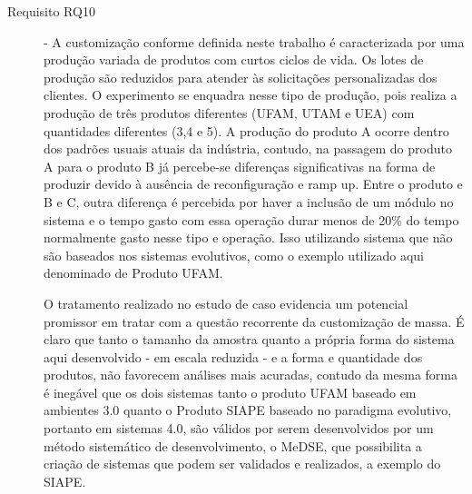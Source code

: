 \documentclass[10pt,letterpaper,twocolumn]{IEEEtran}
\begin{document}
\begin{description}
	\item[Requisito RQ10] - A customização conforme definida neste trabalho é caracterizada por uma produção variada de produtos com curtos  ciclos de vida. Os lotes de produção são reduzidos para atender às solicitações personalizadas dos clientes. O experimento se enquadra nesse tipo de produção, pois realiza a produção de três produtos diferentes (UFAM, UTAM e UEA) com quantidades diferentes (3,4 e 5). A produção do produto A ocorre dentro dos padrões usuais atuais da indústria, contudo, na passagem do produto A para o produto B já percebe-se diferenças significativas na forma de produzir devido à ausência de reconfiguração e ramp up. Entre o produto e B e C, outra diferença é percebida por haver a inclusão de um módulo no sistema e o tempo gasto com essa operação durar menos de 20\% do tempo normalmente gasto nesse tipo e operação. Isso utilizando  sistema que não são baseados nos sistemas evolutivos, como o exemplo utilizado aqui denominado de Produto UFAM. \par 
	O tratamento realizado no estudo de caso evidencia um potencial promissor em tratar com a questão recorrente da customização de massa. É claro que tanto o tamanho da amostra quanto a própria forma do sistema aqui desenvolvido - em escala reduzida - e a forma e quantidade dos produtos, não favorecem análises mais acuradas, contudo da mesma forma é inegável que os dois sistemas tanto o produto UFAM baseado em ambientes 3.0 quanto o Produto SIAPE baseado no paradigma evolutivo, portanto em sistemas 4.0, são válidos por serem desenvolvidos por um método sistemático de desenvolvimento, o MeDSE, que possibilita a criação de sistemas que podem ser validados e realizados, a exemplo do SIAPE.
	

\end{description}
\end{document}
